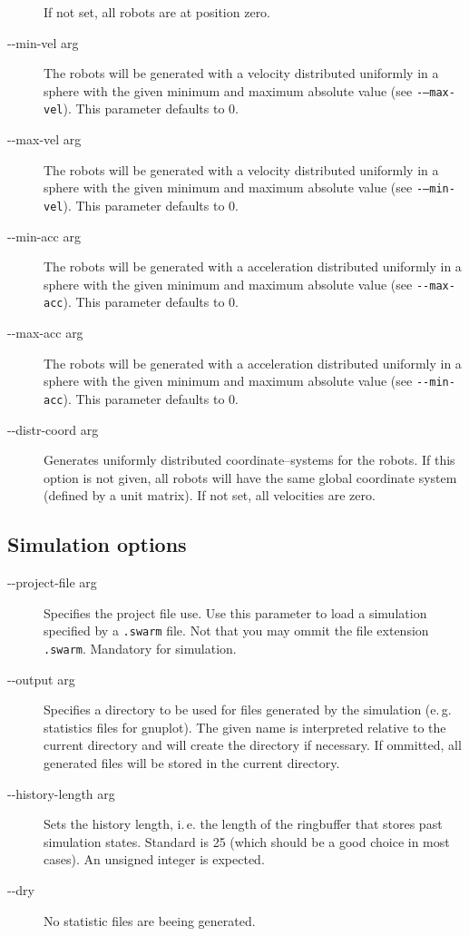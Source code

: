 \documentclass[a4paper,halfparskip,11pt,twoside]{scrartcl}
\newcommand{\gnuplot}{ {\sffamily gnuplot}\xspace}
\begin{document}
\begin{description}
 If not set, all robots are at position zero.
	\item [-{}-min-vel arg] The robots will be generated with a velocity distributed uniformly in a sphere with the given minimum and maximum absolute value (see {\tt -{}---max-vel}). This parameter defaults to 0.
	\item [-{}-max-vel arg] The robots will be generated with a velocity distributed uniformly in a sphere with the given minimum and maximum absolute value (see {\tt -{}---min-vel}). This parameter defaults to 0.
	\item [-{}-min-acc arg] The robots will be generated with a acceleration distributed uniformly in a sphere with the given minimum and maximum absolute value (see {\tt -{}-max-acc}). This parameter defaults to 0.
	\item [-{}-max-acc arg] The robots will be generated with a acceleration distributed uniformly in a sphere with the given minimum and maximum absolute value (see {\tt -{}-min-acc}). This parameter defaults to 0.
	\item [-{}-distr-coord arg] Generates uniformly distributed coordinate--systems for the robots. If this option is not given, all robots will have the same global coordinate system (defined by a unit matrix).
 If not set, all velocities are zero.
\end{description}

\subsection{Simulation options}
\begin{description}
	\item [-{}-project-file arg] Specifies the project file use. Use this parameter to load a simulation specified by a {\tt .swarm} file. Not that you may ommit the file extension {\tt .swarm}. Mandatory for simulation.
	\item [-{}-output arg] Specifies a directory to be used for files generated by the simulation (e.\,g. statistics files for \gnuplot). The given name is interpreted relative to the current directory and will create the directory if necessary. If ommitted, all generated files will be stored in the current directory.
	\item [-{}-history-length arg] Sets the history length, i.\,e. the length of the ringbuffer that stores past simulation states. Standard is 25 (which should be a good choice in most cases). An unsigned integer is expected.
	\item [-{}-dry] No statistic files are beeing generated.
\end{description}
\end{document}
